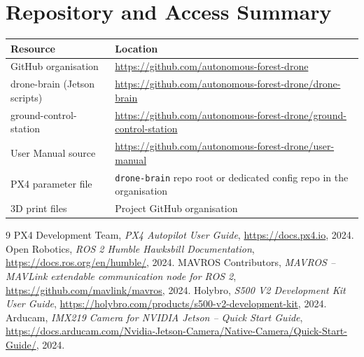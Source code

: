 \documentclass{article}
\begin{document}
\section{Repository and Access Summary}

\begin{tabular}{p{4.5cm}p{9cm}}
\toprule
\textbf{Resource} & \textbf{Location} \\
\midrule
GitHub organisation & \url{https://github.com/autonomous-forest-drone} \\
drone-brain (Jetson scripts) & \url{https://github.com/autonomous-forest-drone/drone-brain} \\
ground-control-station & \url{https://github.com/autonomous-forest-drone/ground-control-station} \\
User Manual source & \url{https://github.com/autonomous-forest-drone/user-manual} \\
PX4 parameter file & \texttt{drone-brain} repo root or dedicated config repo in the organisation \\
3D print files & Project GitHub organisation \\
\bottomrule
\end{tabular}

\begin{thebibliography}{9}
    PX4 Development Team,
    \emph{PX4 Autopilot User Guide},
    \url{https://docs.px4.io}, 2024.
    Open Robotics,
    \emph{ROS 2 Humble Hawksbill Documentation},
    \url{https://docs.ros.org/en/humble/}, 2024.
    MAVROS Contributors,
    \emph{MAVROS -- MAVLink extendable communication node for ROS 2},
    \url{https://github.com/mavlink/mavros}, 2024.
    Holybro,
    \emph{S500 V2 Development Kit User Guide},
    \url{https://holybro.com/products/s500-v2-development-kit}, 2024.
    Arducam,
    \emph{IMX219 Camera for NVIDIA Jetson -- Quick Start Guide},
    \url{https://docs.arducam.com/Nvidia-Jetson-Camera/Native-Camera/Quick-Start-Guide/}, 2024.
\end{thebibliography}
\end{document}
